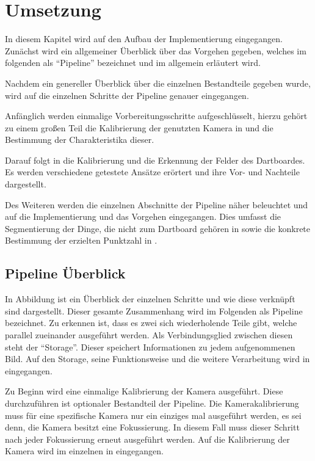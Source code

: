 
\chapter{Umsetzung}
\label{chap:coding}
In diesem Kapitel wird auf den Aufbau der Implementierung eingegangen. Zunächst wird ein allgemeiner Überblick über das Vorgehen gegeben, welches im folgenden als "`Pipeline"' bezeichnet und im  allgemein erläutert wird.

Nachdem ein genereller Überblick über die einzelnen Bestandteile gegeben wurde, wird auf die einzelnen Schritte der Pipeline genauer eingegangen.

Anfänglich werden einmalige Vorbereitungsschritte aufgeschlüsselt, hierzu gehört zu einem großen Teil die Kalibrierung der genutzten Kamera in  und die Bestimmung der Charakteristika dieser. 

Darauf folgt in  die Kalibrierung und die Erkennung der Felder des Dartboardes. Es werden verschiedene getestete Ansätze erörtert und ihre Vor- und Nachteile dargestellt.

Des Weiteren werden die einzelnen Abschnitte der Pipeline näher beleuchtet und auf die Implementierung und das Vorgehen eingegangen.  Dies umfasst die Segmentierung der Dinge, die nicht zum Dartboard gehören in  sowie die konkrete
Bestimmung der erzielten Punktzahl in .
       
\section{Pipeline Überblick}
\label{sec:pipeline}
In Abbildung  ist ein Überblick der einzelnen Schritte und wie diese verknüpft sind dargestellt. Dieser gesamte Zusammenhang wird im Folgenden als Pipeline bezeichnet.
Zu erkennen ist, dass es zwei sich wiederholende Teile gibt, welche parallel zueinander ausgeführt werden.
 Als Verbindungsglied zwischen diesen steht der "`Storage"'. Dieser speichert Informationen zu jedem aufgenommenen Bild. Auf den Storage, seine Funktionsweise und die weitere Verarbeitung wird in  eingegangen. 

Zu Beginn wird eine einmalige Kalibrierung der Kamera ausgeführt. Diese durchzuführen ist optionaler Bestandteil der Pipeline. Die Kamerakalibrierung muss für eine spezifische Kamera nur ein einziges mal ausgeführt werden, es sei denn, die Kamera besitzt eine Fokussierung. In diesem Fall muss dieser Schritt nach jeder Fokussierung erneut ausgeführt werden. Auf die Kalibrierung der Kamera wird im einzelnen in  eingegangen.

